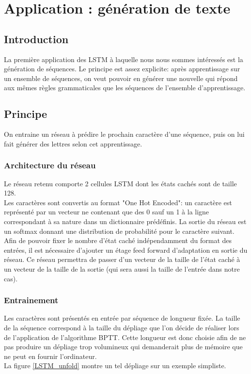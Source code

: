\chapter{Application : génération de texte}

\section{Introduction}

La première application des LSTM à laquelle nous nous sommes intéressés est la génération de séquences. Le principe est assez explicite: après apprentissage sur un ensemble de séquences, on veut pouvoir en générer une nouvelle qui répond aux mêmes règles grammaticales que les séquences de l'ensemble d'apprentissage.
 

\section{Principe}
On entraine un réseau à prédire le prochain caractère d'une séquence, puis on lui fait générer des lettres selon cet apprentissage.

\subsection{Architecture du réseau}

Le réseau retenu comporte 2 cellules LSTM dont les états cachés sont de taille 128.
\\ Les caractères sont convertis au format "One Hot Encoded": un caractère est représenté par un vecteur ne contenant que des 0 sauf un 1 à la ligne correspondant à sa nature dans un dictionnaire prédéfinis. La sortie du réseau est un softmax donnant une distribution de probabilité pour le caractère suivant.
\\ Afin de pouvoir fixer le nombre d'état caché indépendamment du format des entrées, il est nécessaire d'ajouter un étage feed forward d'adaptation en sortie du réseau. Ce réseau permettra de passer d'un vecteur de la taille de l'état caché à un vecteur de la taille de la sortie (qui sera aussi la taille de l'entrée dans notre cas).

\subsection{Entrainement}

Les caractères sont présentés en entrée par séquence de longueur fixée. La taille de la séquence correspond à la taille du dépliage que l'on décide de réaliser lors de l'application de l'algorithme BPTT. Cette longueur est donc choisie afin de ne pas produire un dépliage trop volumineux qui demanderait plus de mémoire que ne peut en fournir l'ordinateur.
\\ La figure \ref{LSTM_unfold} montre un tel dépliage sur un exemple simpliste.

